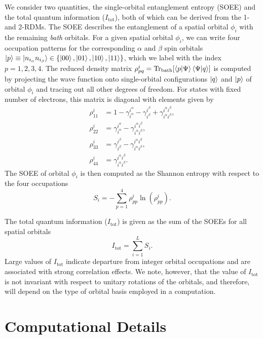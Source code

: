 \documentclass[aip,jcp,amsmath,amssymb, reprint]{revtex4-1}
\begin{document}
We consider two quantities, the single-orbital entanglement entropy (SOEE) and the total quantum information ($I_\mathrm{tot}$), both of which can be derived from the 1- and 2-RDMs.
The SOEE describes the entanglement of a spatial orbital $\phi_i$ with the remaining \textit{bath} orbitals.
For a given spatial orbital $\phi_i$, we can write four occupation patterns for the corresponding $\alpha$ and $\beta$ spin orbitals $\ket{p} \equiv \ket{n_{i_\alpha}n_{i_\beta}} \in \{\ket{00},\ket{01},\ket{10}, \ket{11}\}$, which we label with the index $p = 1,2,3,4$.
The reduced density matrix $\rho^i_{pq} = \mathrm{Tr}_\mathrm{bath} [\braket{p|\Psi}\braket{\Psi|q}]$ is computed by projecting the wave function onto single-orbital configurations $\ket{q}$ and $\ket{p}$ of orbital $\phi_i$ and tracing out all other degrees of freedom. For states with fixed number of electrons, this matrix is diagonal with elements given by
\begin{align}
\rho_{11}^i &= 1 - \gamma_{i^{\alpha}}^{i^{\alpha}} - \gamma_{i^{\beta}}^{i^{\beta}} + \gamma_{i^{\alpha} i^{\beta}}^{i^{\alpha} i^{\beta}}, \\
\rho_{22}^i &= \gamma_{i^{\alpha}}^{i^{\alpha}} - \gamma_{i^{\alpha} i^{\beta}}^{i^{\alpha} i^{\beta}}, \\
\rho_{33}^i &= \gamma_{i^{\beta} }^{i^{\beta} } - \gamma_{i^{\alpha} i^{\beta}}^{i^{\alpha} i^{\beta}}, \\
\rho_{44}^i &=\gamma_{i^{\alpha} i^{\beta} }^{i^{\alpha} i^{\beta}}.
\end{align}
The SOEE of orbital $\phi_i$ is then computed as the Shannon entropy with respect to the four occupations
\begin{equation}
S_{i} = -\sum_{p=1}^{4} \rho^{i}_{pp} \ln(\rho^{i}_{pp}).
\label{eq:soee}
\end{equation}


The total quantum information ($I_\mathrm{tot}$) is given as the sum of the SOEEs for all spatial orbitals
\begin{equation}
I_\mathrm{tot} = \sum_{i=1}^{L} S_{i}.
\end{equation}
Large values of $I_\mathrm{tot}$ indicate departure from integer orbital occupations and are associated with strong correlation effects.\cite{murg2015tree}
We note, however, that the value of $I_\mathrm{tot}$ is not invariant with respect to unitary rotations of the orbitals, and therefore, will depend on the type of orbital basis employed in a computation.

\section{\label{sec:compu_details}Computational Details}
\end{document}
